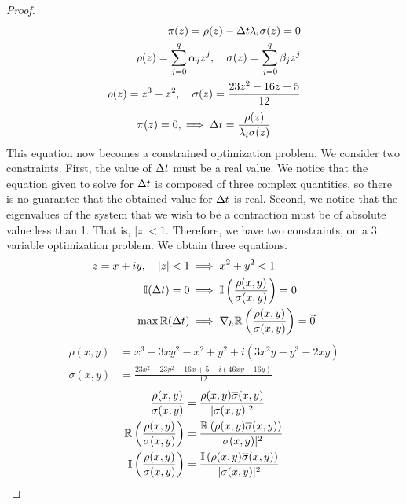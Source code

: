 \documentclass{article}
\begin{document}
\begin{enumerate}[label=\alph*)]
\begin{proof}
      \begin{align*}
        \pi(z) = \rho(z) - \Delta t\lambda_i\sigma(z) = 0\\
        \rho(z) = \sum_{j=0}^{q} \alpha_j z^j, \quad 
        \sigma(z) = \sum_{j=0}^{q} \beta_j z^j \\
        \rho(z) = z^3 - z^2, \quad \sigma(z) = \frac{23z^2 - 16z + 5}{12}
      \end{align*}   
      \begin{align}
        \pi(z)=0, \implies \Delta t = \frac{\rho(z)}{\lambda_i \sigma(z)}
      \end{align}
      This equation now becomes a constrained optimization problem. We consider
      two constraints. First, the value of $\Delta t$ must be a real value. We notice
      that the equation given to solve for $\Delta t$ is composed of three complex
      quantities, so there is no guarantee that the obtained value for $\Delta t$ is
      real. Second, we notice that the eigenvalues of the system that we wish to
      be a contraction must be of absolute value less than 1. That is, $|z| <
      1$. Therefore, we have two constraints, on a 3 variable optimization
      problem. We obtain three equations. 
      \begin{align}
        z = x + iy, \quad |z| < 1 &\implies x^2 + y^2 < 1\\
        \mathbb{I}(\Delta t) = 0 &\implies \mathbb{I}\left(\frac{\rho(x,
        y)}{\sigma(x, y)}\right) = 0\\
        \max \mathbb{R}(\Delta t) &\implies \nabla_h \mathbb{R}\left(\frac{\rho(x, y)}{\sigma(x,
        y)}\right) = \vec{0}
      \end{align}
      \begin{align*}
        \rho(x, y) &= x^3 - 3xy^2 - x^2 + y^2 + i\left(3x^2y - y^3 - 2xy\right)\\
        \sigma(x, y) &= \frac{23x^2 - 23y^2 -16x + 5 + i\left(46xy -16y\right)}{12}
      \end{align*}
      \begin{align*}
        \frac{\rho(x,y)}{\sigma(x,y)} &=
        \frac{\rho(x,y)\overline{\sigma}(x,y)}{|\sigma(x,y)|^2}\\
        \mathbb{R}\left(\frac{\rho(x,y)}{\sigma(x,y)}\right) &=
        \frac{\mathbb{R}\left(\rho(x,y)\overline{\sigma}(x,y)\right)}{|\sigma(x,y)|^2}\\
        \mathbb{I}\left(\frac{\rho(x,y)}{\sigma(x,y)}\right) &=
        \frac{\mathbb{I}\left(\rho(x,y)\overline{\sigma}(x,y)\right)}{|\sigma(x,y)|^2}\\
      \end{align*}

\end{proof}
\end{enumerate}
\end{document}
